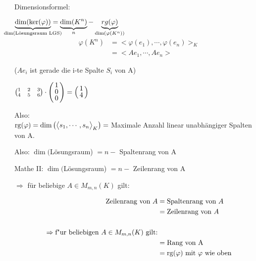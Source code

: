 Dimensionsformel:

$\underbrace{\dim(\ker(\varphi))}_{\mathclap{\dim(\text{Lösungsraum LGS})}} = \underbrace{\dim(K^n)}_{n} -
\underbrace{rg(\varphi)}_{\dim(\varphi(K^n))}$\bigskip
\begin{align*}
\varphi(K^n) &= \big < \varphi(e_1),\cdots,\varphi(e_n)\big>_K\\
&= \big < Ae_1,\cdots,Ae_n \big >
\end{align*}

($Ae_i$ ist gerade die i-te Spalte $S_i$ von A)

$\binom{1\quad2\quad3}{4\quad5\quad6} \cdot
\vct{1 \\ 0\\ 0} = \vct{1\\4} $\

Also:\\
 $\mathrm{ rg }(\varphi) = \dim\big(\big < s_1,\cdots,s_n \big >_K\big) =$ Maximale Anzahl linear unabhängiger Spalten von A.\bigskip

Also: $\dim($Lösungsraum) $= n - $ Spaltenrang von A

Mathe II: $\dim($Lösungsraum) $= n - $ Zeilenrang von A

$\Rightarrow$ für beliebige $A \in M_{m,n}(K)$ gilt:

\begin{align*}
\text{Zeilenrang von } A &= \text{Spaltenrang von } A\\
&= \text{Zeilenrang von } A\\\\
\Rightarrow\text{f"ur beliebigen } A \in M_{m,n}(K) \text{ gilt:}\\
&= \text{Rang von A}\\
&= \mathrm{ rg }(\varphi) \text{ mit } \varphi \text{ wie oben}
\end{align*}

